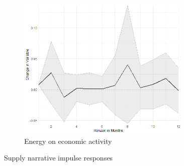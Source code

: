 \begin{figure}
\begin{subfigure}{00.24\textwidth}
		\includegraphics[width=0.9\textwidth]{output/lp/baseline/level/energy/energyoneconac_djn.png}
		\caption{Energy on economic activity}
	\end{subfigure}
	\caption{Supply narrative impulse responses}
	\label{fig:irf_2}
\end{figure}